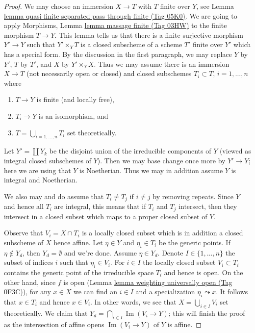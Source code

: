 \documentclass{amsart}
\theoremstyle{plain}
\theoremstyle{definition}
\theoremstyle{remark}
\numberwithin{equation}{subsection}
\def\Im{\mathop{\mathrm{Im}}}
\begin{document}
\begin{proof}
\medskip\noindent
We may choose an immersion $X \to T$ with $T$ finite over $Y$, see Lemma
\href{https://stacks.math.columbia.edu/tag/05K0}{lemma quasi finite separated pass through finite (Tag 05K0)}.
We are going to apply Morphisms, Lemma \href{https://stacks.math.columbia.edu/tag/03HW}{lemma massage finite (Tag 03HW)}
to the finite morphism $T \to Y$. This lemma tells us that
there is a finite surjective morphism $Y' \to Y$ such that
$Y' \times_Y T$ is a closed subscheme of a scheme $T'$ finite over $Y'$
which has a special form.
By the discussion in the first paragraph, we may replace $Y$ by $Y'$,
$T$ by $T'$, and $X$ by $Y' \times_Y X$.
Thus we may assume there is an immersion $X \to T$ (not necessarily
open or closed) and closed subschemes
$T_i \subset T$, $i = 1, \ldots, n$ where
\begin{enumerate}
\item $T \to Y$ is finite (and locally free),
\item $T_i \to Y$ is an isomorphism, and
\item $T = \bigcup_{i = 1, \ldots, n} T_i$ set theoretically.
\end{enumerate}
Let $Y' = \coprod Y_k$ be the disjoint union of the irreducible
components of $Y$ (viewed as integral closed subschemes of $Y$).
Then we may base change once more by $Y' \to Y$; here we
are using that $Y$ is Noetherian. Thus we may in
addition assume $Y$ is integral and Noetherian.

\medskip\noindent
We also may and do assume that $T_i \not = T_j$ if $i \not = j$ by
removing repeats. Since $Y$ and hence all $T_i$ are integral, this
means that if $T_i$ and $T_j$ intersect, then they intersect in a
closed subset which maps to a proper closed subset of $Y$.

\medskip\noindent
Observe that $V_i = X \cap T_i$ is a locally closed subset
which is in addition a closed subscheme of $X$ hence affine.
Let $\eta \in Y$ and $\eta_i \in T_i$ be the generic points.
If $\eta \not \in Y_d$, then $Y_d = \emptyset$ and we're done.
Assume $\eta \in Y_d$. Denote $I \in \{1, \ldots, n\}$
the subset of indices $i$ such that $\eta_i \in V_i$.
For $i \in I$ the locally closed subset $V_i \subset T_i$
contains the generic point of the irreducible space $T_i$
and hence is open. On the other hand, since $f$ is open
(Lemma \href{https://stacks.math.columbia.edu/tag/0F3C}{lemma weighting universally open (Tag 0F3C)}),
for any $x \in X$ we can find an $i \in I$ and a specialization
$\eta_i \leadsto x$. It follows that $x \in T_i$ and hence
$x \in V_i$. In other words, we see that $X = \bigcup_{i \in I} V_i$
set theoretically.
We claim that $Y_d = \bigcap_{i \in I} \Im(V_i \to Y)$; this will
finish the proof as the intersection of affine opens
$\Im(V_i \to Y)$ of $Y$ is affine.


\end{proof}
\end{document}
